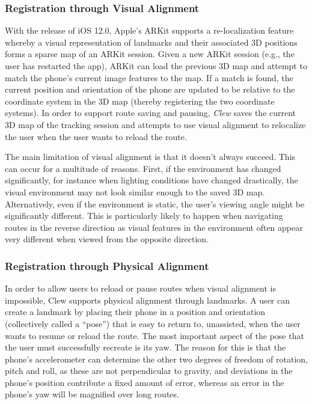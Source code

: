 \documentclass[chi_draft]{sigchi}
\begin{document}
\subsubsection{Registration through Visual Alignment}
With the release of iOS 12.0, Apple's ARKit supports a re-localization feature whereby a visual representation of landmarks and their associated 3D positions forms a sparse map of an ARKit session.  Given a new ARKit session (e.g., the user has restarted the app), ARKit can load the previous 3D map and attempt to match the phone's current image features to the map.  If a match is found, the current position and orientation of the phone are updated to be relative to the coordinate system in the 3D map (thereby registering the two coordinate systems).  In order to support route saving and pausing, \emph{Clew} saves the current 3D map of the tracking session and attempts to use visual alignment to relocalize the user when the user wants to reload the route.

The main limitation of visual alignment is that it doesn't always succeed.  This can occur for a multitude of reasons.  First, if the environment has changed significantly, for instance when lighting conditions have changed drastically, the visual environment may not look similar enough to the saved 3D map.  Alternatively, even if the environment is static, the user's viewing angle might be significantly different.  This is particularly likely to happen when navigating routes in the reverse direction as visual features in the environment often appear very different when viewed from the opposite direction.


\subsubsection{Registration through Physical Alignment}

In order to allow users to reload or pause routes when visual alignment is impossible, Clew supports physical alignment through landmarks.  A user can create a landmark by placing their phone in a position and orientation (collectively called a ``pose'') that is easy to return to, unassisted, when the user wants to resume or reload the route.  The most important aspect of the pose that the user must successfully recreate is its yaw.  The reason for this is that the phone's accelerometer can determine the other two degrees of freedom of rotation, pitch and roll, as these are not perpendicular to gravity, and deviations in the phone's position contribute a fixed amount of error, whereas an error in the phone's yaw will be magnified over long routes.
\end{document}
